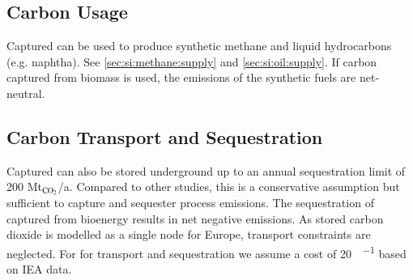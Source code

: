\subsection{Carbon Usage}

Captured \co can be used to produce synthetic methane and liquid hydrocarbons
(e.g. naphtha). See \cref{sec:si:methane:supply} and \cref{sec:si:oil:supply}.
If carbon captured from biomass is used, the \co emissions of the synthetic
fuels are net-neutral.

\subsection{Carbon Transport and Sequestration}

Captured \co can also be stored underground up to an annual sequestration limit
of 200 Mt$_{\ce{CO2}}$/a. Compared to other studies, this is a conservative assumption but
sufficient to capture and sequester process emissions. The sequestration of
captured \co from bioenergy results in net negative emissions. As stored carbon
dioxide is modelled as a single node for Europe, transport constraints are
neglected. For for \co transport and sequestration we assume a cost of
\SI{20}{\sieuro\per\tco} based on IEA data.

